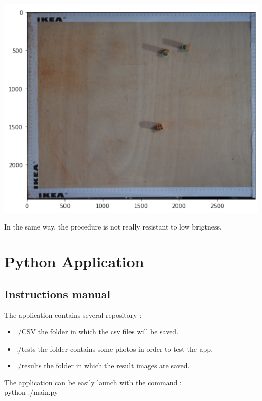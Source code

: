\documentclass{article}
\begin{document}
\begin{minipage}{.6\textwidth}%
\includegraphics[width=\textwidth]{images/img37.png}
\end{minipage}%
\hfill
\begin{minipage}{.35\textwidth}%
In the same way, the procedure is not really resistant to low brigtness.
\end{minipage}%

\section{Python Application}

\subsection{Instructions manual}

The application contains several repository :\\
\begin{itemize}
\item ./CSV   the folder in which the csv files will be saved.
\item ./tests  the folder contains some photos in order to  test the app.
\item ./results  the folder in which the result images are saved.
\end{itemize}

The application can be easily launch with the command : \\
python ./main.py\\
\end{document}
